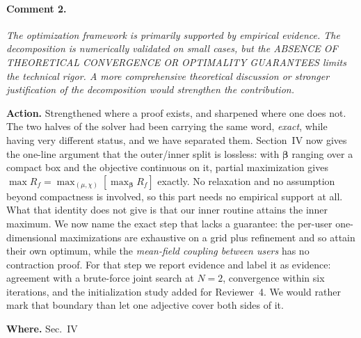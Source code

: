 \documentclass[10pt]{article}
\newcommand{\Rf}{R_f}
\newcommand{\rev}[1]{\par\medskip\noindent\textit{#1}\par\smallskip}
\newcommand{\act}[2]{\noindent\textbf{Action.} #1\par\noindent\textbf{Where.} #2\par}
\begin{document}
\paragraph{Comment 2.}
\rev{The optimization framework is primarily supported by empirical evidence. The decomposition is numerically validated on small cases, but the ABSENCE OF THEORETICAL CONVERGENCE OR OPTIMALITY GUARANTEES limits the technical rigor. A more comprehensive theoretical discussion or stronger justification of the decomposition would strengthen the contribution.}
\act{Strengthened where a proof exists, and sharpened where one does not. The two halves of the solver had been carrying the same word, \emph{exact}, while having very different status, and we have separated them. Section~IV now gives the one-line argument that the outer/inner split is lossless: with $\boldsymbol{\beta}$ ranging over a compact box and the objective continuous on it, partial maximization gives $\max \Rf = \max_{(\mu,\chi)}[\max_{\boldsymbol{\beta}} \Rf]$ exactly. No relaxation and no assumption beyond compactness is involved, so this part needs no empirical support at all. What that identity does not give is that our inner routine attains the inner maximum. We now name the exact step that lacks a guarantee: the per-user one-dimensional maximizations are exhaustive on a grid plus refinement and so attain their own optimum, while the \emph{mean-field coupling between users} has no contraction proof. For that step we report evidence and label it as evidence: agreement with a brute-force joint search at $N{=}2$, convergence within six iterations, and the initialization study added for Reviewer~4. We would rather mark that boundary than let one adjective cover both sides of it.}{Sec.~IV}
\end{document}
